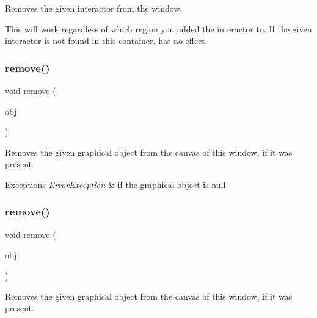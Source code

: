 Removes the given interactor from the window. 

This will work regardless of which region you added the interactor to. If the given interactor is not found in this container, has no effect. \mbox{\label{classGWindow_afc8bff4a24e05c696cbe4cba7403e558}} 
\subsubsection{\texorpdfstring{remove()}{remove()}\hspace{0.1cm}{\footnotesize\ttfamily [3/4]}}
{\footnotesize\ttfamily void remove (\begin{DoxyParamCaption}\item[{\mbox{\hyperlink{classGObject}{G\+Object}} $\ast$}]{obj }\end{DoxyParamCaption})\hspace{0.3cm}{\ttfamily [virtual]}}



Removes the given graphical object from the canvas of this window, if it was present. 


\begin{DoxyExceptions}{Exceptions}
{\em \mbox{\hyperlink{classErrorException}{Error\+Exception}}} & if the graphical object is null \\
\hline
\end{DoxyExceptions}
\mbox{\label{classGWindow_a37cf4a26853ac22c5e3a21335dfc7ac9}} 
\subsubsection{\texorpdfstring{remove()}{remove()}\hspace{0.1cm}{\footnotesize\ttfamily [4/4]}}
{\footnotesize\ttfamily void remove (\begin{DoxyParamCaption}\item[{\mbox{\hyperlink{classGObject}{G\+Object}} \&}]{obj }\end{DoxyParamCaption})\hspace{0.3cm}{\ttfamily [virtual]}}



Removes the given graphical object from the canvas of this window, if it was present. 

